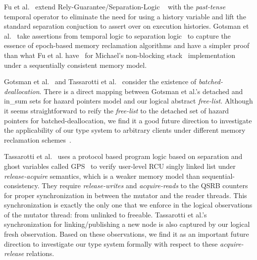  Fu et al.~\cite{shao_temp} extend Rely-Guarantee/Separation-Logic ~\cite{vafeiadis07,Feng:2007:RCS:1762174.1762193,Feng:2009:LRR:1480881.1480922} with the \textit{past-tense} temporal operator to eliminate the need for using a history variable and lift the standard separation conjuction to assert over on execution histories. Gotsman et al.~\cite{Gotsman:2013:VCM:2450268.2450289} take assertions from temporal logic to separation logic~\cite{vafeiadis07} to capture the essence of epoch-based memory reclamation algorithms and have a simpler proof than what Fu et al. have~\cite{shao_temp} for Michael's non-blocking stack~\cite{Michael:2004:HPS:987524.987595} implementation under a sequentially consistent memory model.

 Gotsman et al.~\cite{Gotsman:2013:VCM:2450268.2450289} and Tassarotti et al.~\cite{verrcu} consider the existence of \textit{batched-deallocation}. There is a direct mapping between Gotsman et al.'s \textsf{detached} and \textsf{in\_sum} sets for hazard pointers model and our logical abstract \textit{free-list}. Although it seems straightforward to reify the \textit{free-list} to the \textsf{detached} set of hazard pointers for batched-deallocation, we find it a good future direction to investigate the applicability of our type system to arbitrary clients under different memory reclamation schemes~\cite{Wen:2018:IMR:3178487.3178488,Michael:2004:HPS:987524.987595,Mckenney:2004:EDD:1048173,UCAM-CL-TR-579}.

 Tassarotti et al.~\cite{verrcu} uses a protocol based program logic based on separation and ghost variables called \textsf{GPS}~\cite{Turon:2014:GNW:2660193.2660243} to verify user-level \textsf{RCU} singly linked list under \emph{release-acquire} semantics, which is a weaker memory model than sequential-consistency. They require \textit{release-writes} and \textit{acquire-reads} to the QSRB counters for proper synchronization in between the mutator and the reader threads. This synchronization is exactly the only one that we enforce in the logical observations of the mutator thread: from \textsf{unlinked} to \textsf{freeable}. Tassarotti et al.'s synchronization for linking/publishing a new node is also captured by our logical \textsf{fresh} observation. Based on these observations, we find it as an important future direction to investigate our type system formally with respect to these \textit{acquire-release} relations.

